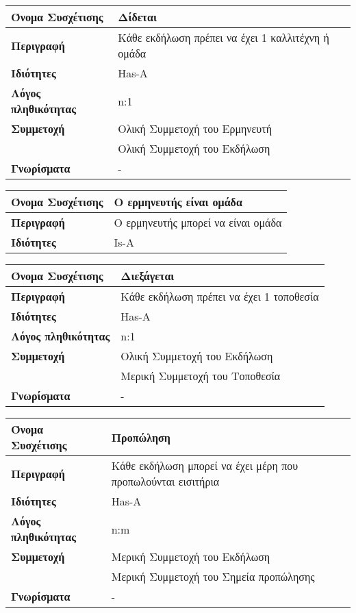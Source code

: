 \begin{center}
\begin{tabular}[]{|p{4cm}|p{10cm}|}
  \hline
  \textbf{Όνομα Συσχέτισης} & Δίδεται \\ \hline
  \textbf{Περιγραφή} & Κάθε εκδήλωση πρέπει να έχει 1 καλλιτέχνη ή ομάδα\\ \hline
  \textbf{Ιδιότητες} & Has-A  \\ \hline
  \textbf{Λόγος πληθικότητας} & n:1 \\ \hline
  \textbf{Συμμετοχή} & Ολική Συμμετοχή του Ερμηνευτή\\ \cline{2-2}
                     & Ολική Συμμετοχή του Εκδήλωση \\ \hline
  \textbf{Γνωρίσματα} & - \\ \hline
\end{tabular}
\vspace{0.3 cm}


\begin{tabular}[]{|p{4cm}|p{10cm}|}
  \hline
  \textbf{Όνομα Συσχέτισης} &Ο ερμηνευτής είναι ομάδα\\ \hline
  \textbf{Περιγραφή} & Ο ερμηνευτής μπορεί να είναι ομάδα\\ \hline
  \textbf{Ιδιότητες} & Is-A  \\ \hline
\end{tabular}
\vspace{0.3 cm}


\begin{tabular}[]{|p{4cm}|p{10cm}|}
  \hline
  \textbf{Όνομα Συσχέτισης} & Διεξάγεται\\ \hline
  \textbf{Περιγραφή} & Κάθε εκδήλωση πρέπει να έχει 1 τοποθεσία\\ \hline
  \textbf{Ιδιότητες} & Has-A \\ \hline
  \textbf{Λόγος πληθικότητας} & n:1 \\ \hline
  \textbf{Συμμετοχή} & Ολική Συμμετοχή του Εκδήλωση\\ \cline{2-2}
                     & Μερική Συμμετοχή του Τοποθεσία \\ \hline
  \textbf{Γνωρίσματα} & - \\ \hline
\end{tabular}
\vspace{0.3 cm}


\begin{tabular}[]{|p{4cm}|p{10cm}|}
  \hline
  \textbf{Όνομα Συσχέτισης} & Προπώληση \\ \hline
  \textbf{Περιγραφή} & Κάθε εκδήλωση μπορεί να έχει μέρη που προπωλούνται εισιτήρια\\ \hline
  \textbf{Ιδιότητες} & Has-A \\ \hline
  \textbf{Λόγος πληθικότητας} & n:m \\ \hline
  \textbf{Συμμετοχή} & Μερική Συμμετοχή του Εκδήλωση \\ \cline{2-2}
                     & Μερική Συμμετοχή του Σημεία προπώλησης\\ \hline
  \textbf{Γνωρίσματα} & - \\ \hline
\end{tabular}
\vspace{0.3 cm}



\end{center}
